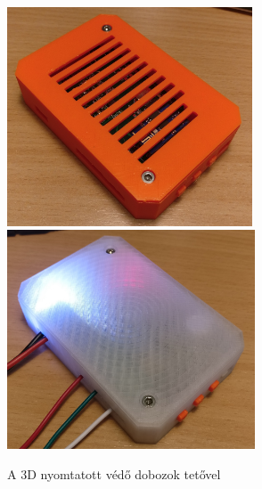 \documentclass[../main.tex]{subfiles}
\begin{document}
            \begin{figure}[h!]
                \centering
                    \includegraphics[height=6.5cm]{resources/pcb_res/printed_case_wtop_ngen}
                    \includegraphics[height=6.5cm]{resources/pcb_res/printed_case_wtop_abs}
                    \caption{A 3D nyomtatott védő dobozok tetővel}
                    \label{fig:printed_cases_2}
            \end{figure}
    
\end{document}
